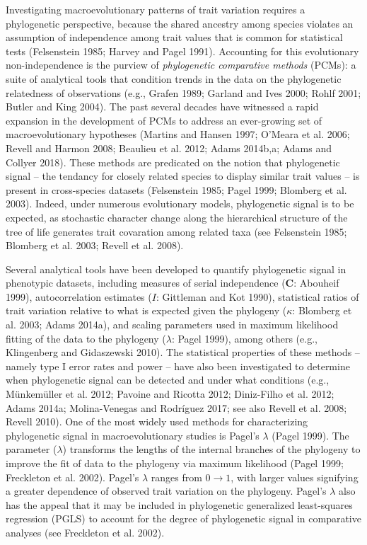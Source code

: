 \documentclass[]{article}
\begin{document}
Investigating macroevolutionary patterns of trait variation requires a
phylogenetic perspective, because the shared ancestry among species
violates an assumption of independence among trait values that is common
for statistical tests (Felsenstein 1985; Harvey and Pagel 1991).
Accounting for this evolutionary non-independence is the purview of
\emph{phylogenetic comparative methods} (PCMs): a suite of analytical
tools that condition trends in the data on the phylogenetic relatedness
of observations (e.g., Grafen 1989; Garland and Ives 2000; Rohlf 2001;
Butler and King 2004). The past several decades have witnessed a rapid
expansion in the development of PCMs to address an ever-growing set of
macroevolutionary hypotheses (Martins and Hansen 1997; O'Meara et al.
2006; Revell and Harmon 2008; Beaulieu et al. 2012; Adams 2014b,a; Adams
and Collyer 2018). These methods are predicated on the notion that
phylogenetic signal -- the tendancy for closely related species to
display similar trait values -- is present in cross-species datasets
(Felsenstein 1985; Pagel 1999; Blomberg et al. 2003). Indeed, under
numerous evolutionary models, phylogenetic signal is to be expected, as
stochastic character change along the hierarchical structure of the tree
of life generates trait covaration among related taxa (see Felsenstein
1985; Blomberg et al. 2003; Revell et al. 2008). \hfill\break

Several analytical tools have been developed to quantify phylogenetic
signal in phenotypic datasets, including measures of serial independence
(\(\mathbf{C}\): Abouheif 1999), autocorrelation estimates (\(I\):
Gittleman and Kot 1990), statistical ratios of trait variation relative
to what is expected given the phylogeny (\(\kappa\): Blomberg et al.
2003; Adams 2014a), and scaling parameters used in maximum likelihood
fitting of the data to the phylogeny (\(\lambda\): Pagel 1999), among
others (e.g., Klingenberg and Gidaszewski 2010). The statistical
properties of these methods -- namely type I error rates and power --
have also been investigated to determine when phylogenetic signal can be
detected and under what conditions (e.g., Münkemüller et al. 2012;
Pavoine and Ricotta 2012; Diniz-Filho et al. 2012; Adams 2014a;
Molina-Venegas and Rodríguez 2017; see also Revell et al. 2008; Revell
2010). One of the most widely used methods for characterizing
phylogenetic signal in macroevolutionary studies is Pagel's \(\lambda\)
(Pagel 1999). The parameter (\(\lambda\)) transforms the lengths of the
internal branches of the phylogeny to improve the fit of data to the
phylogeny via maximum likelihood (Pagel 1999; Freckleton et al. 2002).
Pagel's \(\lambda\) ranges from \(0\to1\), with larger values signifying
a greater dependence of observed trait variation on the phylogeny.
Pagel's \(\lambda\) also has the appeal that it may be included in
phylogenetic generalized least-squares regression (PGLS) to account for
the degree of phylogenetic signal in comparative analyses (see
Freckleton et al. 2002). \hfill\break 
\end{document}
